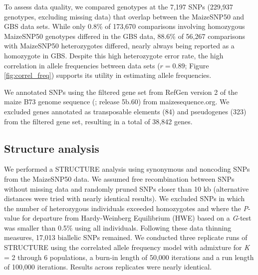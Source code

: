 To assess data quality, we compared genotypes at the 7,197 SNPs (229,937 genotypes, excluding missing data) that overlap between the MaizeSNP50 and GBS data sets. 
While only 0.8\% of 173,670  comparisons involving homozygous MaizeSNP50 genotypes differed in the GBS data, 88.6\% of 56,267 comparisons with MaizeSNP50 heterozygotes differed, nearly always being reported as a homozygote in GBS.
Despite this high heterozygote error rate,  the high correlation in allele frequencies between data sets ($r=0.89$; Figure \ref{fig:correl_freq}) supports its utility in estimating allele frequencies.  

We annotated SNPs using the filtered gene set from RefGen version 2 of the maize B73 genome sequence (\citealt{Schnable_2009_19965430}; release 5b.60) from maizesequence.org.  
We excluded genes annotated as transposable elements (84) and pseudogenes (323) from the filtered gene set, resulting in a total of 38,842 genes.

\subsection*{Structure analysis}
We performed a {\sf STRUCTURE} analysis \cite[]{Pritchard_2000_10835412,Falush_2003_12930761} using  synonymous and noncoding SNPs from the MaizeSNP50 data. 
We assumed free recombination between SNPs without missing data and randomly pruned SNPs closer than 10 kb (alternative distances were tried with nearly identical results). 
We excluded SNPs in which the number of heterozygous individuals exceeded homozygotes and where the \emph{P}-value for departure from Hardy-Weinberg Equilibrium (HWE) based on a \emph{G}-test was smaller than 0.5\% using all individuals. 
Following these data thinning measures, 17,013 biallelic SNPs remained. 
We conducted three replicate runs of {\sf STRUCTURE} using the correlated allele frequency model with admixture for \emph{K} = 2 through 6 populations, a burn-in length of 50,000 iterations and a run length of 100,000 iterations. 
Results across replicates were nearly identical.

